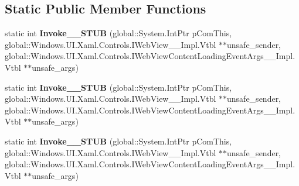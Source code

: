 \subsection*{Static Public Member Functions}
\begin{DoxyCompactItemize}
\item 
\mbox{\label{struct_windows_1_1_foundation_1_1_typed_event_handler___a___windows___u_i___xaml___controls___we27d953ba581e9b4ad25b4f27fbd2d234_a7ae7f192c8c6f908fd3a60da9ff8ae8e}} 
static int {\bfseries Invoke\+\_\+\+\_\+\+S\+T\+UB} (global\+::\+System.\+Int\+Ptr p\+Com\+This, global\+::\+Windows.\+U\+I.\+Xaml.\+Controls.\+I\+Web\+View\+\_\+\+\_\+\+Impl.\+Vtbl $\ast$$\ast$unsafe\+\_\+sender, global\+::\+Windows.\+U\+I.\+Xaml.\+Controls.\+I\+Web\+View\+Content\+Loading\+Event\+Args\+\_\+\+\_\+\+Impl.\+Vtbl $\ast$$\ast$unsafe\+\_\+args)
\item 
\mbox{\label{struct_windows_1_1_foundation_1_1_typed_event_handler___a___windows___u_i___xaml___controls___we27d953ba581e9b4ad25b4f27fbd2d234_a7ae7f192c8c6f908fd3a60da9ff8ae8e}} 
static int {\bfseries Invoke\+\_\+\+\_\+\+S\+T\+UB} (global\+::\+System.\+Int\+Ptr p\+Com\+This, global\+::\+Windows.\+U\+I.\+Xaml.\+Controls.\+I\+Web\+View\+\_\+\+\_\+\+Impl.\+Vtbl $\ast$$\ast$unsafe\+\_\+sender, global\+::\+Windows.\+U\+I.\+Xaml.\+Controls.\+I\+Web\+View\+Content\+Loading\+Event\+Args\+\_\+\+\_\+\+Impl.\+Vtbl $\ast$$\ast$unsafe\+\_\+args)
\item 
\mbox{\label{struct_windows_1_1_foundation_1_1_typed_event_handler___a___windows___u_i___xaml___controls___we27d953ba581e9b4ad25b4f27fbd2d234_a7ae7f192c8c6f908fd3a60da9ff8ae8e}} 
static int {\bfseries Invoke\+\_\+\+\_\+\+S\+T\+UB} (global\+::\+System.\+Int\+Ptr p\+Com\+This, global\+::\+Windows.\+U\+I.\+Xaml.\+Controls.\+I\+Web\+View\+\_\+\+\_\+\+Impl.\+Vtbl $\ast$$\ast$unsafe\+\_\+sender, global\+::\+Windows.\+U\+I.\+Xaml.\+Controls.\+I\+Web\+View\+Content\+Loading\+Event\+Args\+\_\+\+\_\+\+Impl.\+Vtbl $\ast$$\ast$unsafe\+\_\+args)
\item 

\end{DoxyCompactItemize}
